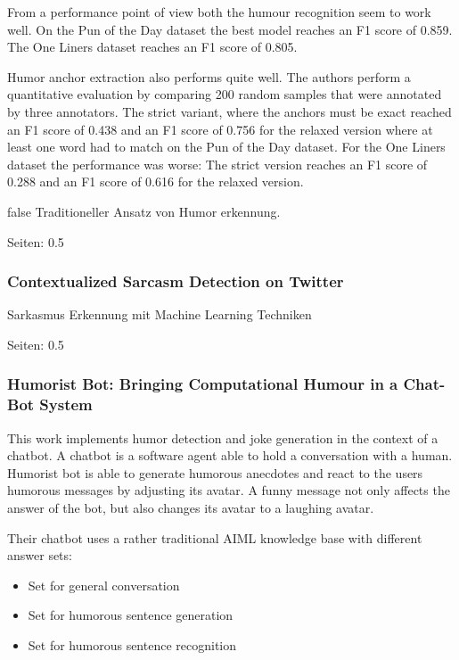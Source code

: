 \documentclass[draft,final,oneside]{vutinfth} %
\begin{document}
From a performance point of view both the humour recognition seem to work well. On the Pun of the Day dataset the best model reaches an F1 score of 0.859. The One Liners dataset reaches an F1 score of 0.805.

Humor anchor extraction also performs quite well. The authors perform a quantitative evaluation by comparing 200 random samples that were annotated by three annotators. The strict variant, where the anchors must be exact reached an F1 score of 0.438 and an F1 score of 0.756 for the relaxed version where at least one word had to match on the Pun of the Day dataset. For the One Liners dataset the performance was worse: The strict version reaches an F1 score of 0.288 and an F1 score of 0.616 for the relaxed version.

\if false
Traditioneller Ansatz von Humor erkennung.

\cite{Yang2015HumorRA}

Seiten: 0.5


\subsubsection{Contextualized Sarcasm Detection on Twitter}
Sarkasmus Erkennung mit Machine Learning Techniken

\cite{Bamman2015ContextualizedSD}

Seiten: 0.5
\fi

\subsubsection{Humorist Bot: Bringing Computational Humour in a Chat-Bot System \cite{HumoristBot}}

This work implements humor detection and joke generation in the context of a chatbot. A chatbot is a software agent able to hold a conversation with a human. Humorist bot is able to generate humorous anecdotes and react to the users humorous messages by adjusting its avatar. A funny message not only affects the answer of the bot, but also changes its avatar to a laughing avatar.

Their chatbot uses a rather traditional AIML knowledge base with different answer sets:
\begin{itemize}
\item Set for general conversation
\item Set for humorous sentence generation
\item Set for humorous sentence recognition
\end{itemize}
\end{document}
